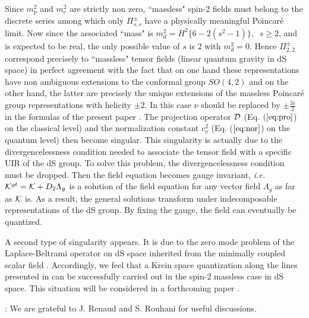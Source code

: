 \documentclass[a4paper,11pt,showpacs,preprintnumbers]{revtex4}
\begin{document}
 Since  $m_p^2$ and
$m_c^2$ are strictly  non zero, ``massless" spin-2 fields must
belong to the discrete series among which only $\Pi^\pm_{s,s}$
have a physically meaningful Poincar\'e limit. Now since the
associated ``mass" is $m_d^2=H^2\{6-2(s^{2}-1)\},\;\;s \geq 2$,
and is expected to be real, the only possible value of $s$ is $2$
with $m_d^2=0$. Hence $\Pi^\pm_{2,2}$ correspond precisely to
``massless" tensor fields (linear quantum gravity in dS space) in
perfect agreement with the fact that on  one hand these
representations have non ambiguous extensions to the conformal
group $SO(4,2)$ and on the other hand, the latter are precisely
the unique extensions of the massless Poincar\'e group
representations with helicity $\pm 2$. In this case $\nu $ should
be replaced by $\pm \frac{3i}{2}$ in the formulas of the present
paper \cite{ta}. The projection operator ${\cal D}$ (Eq.
$(\ref{eq:pro}$) on the classical level) and the normalization
constant $c_\nu^{2}$ (Eq. ($\ref{eq:nor}$) on the quantum level)
then become singular. This singularity is actually due to the
divergencelessness condition needed to associate the tensor field
with a specific UIR of the dS group. To solve this problem, the
divergencelessness condition must be dropped. Then the field
equation becomes gauge invariant, {\it i.e.} ${\cal K}^{gt}={\cal
K}+D_2\Lambda_g$ is a solution of the field equation for any
vector field $\Lambda_g$ as far as ${\cal K}$ is. As a result, the
general solutions transform under  indecomposable representations
of the dS group. By fixing the gauge, the field can  eventually be
quantized.

A second type of singularity appears. It is due to the zero mode
problem of the Laplace-Beltrami operator on dS space inherited
from  the minimally coupled scalar field \cite{gareta1}.
Accordingly, we feel that a Krein space quantization along the
lines presented in
  \cite{gareta1} can be successfully
carried out in the spin-2 massless case in dS space. This
situation will be considered in a forthcoming paper
\cite{gareta2}.

\vspace{0.5cm}

: We are grateful to J. Renaud
and S. Rouhani for useful discussions.
\end{document}
